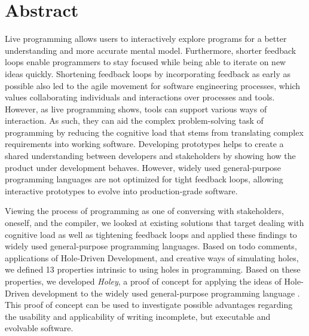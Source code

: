 \chapter{Abstract}
Live programming allows users to interactively explore programs for a better understanding and more accurate mental model.
Furthermore, shorter feedback loops enable programmers to stay focused while being able to iterate on new ideas quickly.
Shortening feedback loops by incorporating feedback as early as possible also led to the agile movement for software engineering processes, which values collaborating individuals and interactions over processes and tools.
However, as live programming shows, tools can support various ways of interaction.
As such, they can aid the complex problem-solving task of programming by reducing the cognitive load that stems from translating complex requirements into working software.
Developing prototypes helps to create a shared understanding between developers and stakeholders by showing how the product under development behaves.
However, widely used general-purpose programming languages are not optimized for tight feedback loops, allowing interactive prototypes to evolve into production-grade software.

Viewing the process of programming as one of conversing with stakeholders, oneself, and the compiler, we looked at existing solutions that target dealing with cognitive load as well as tightening feedback loops and applied these findings to widely used general-purpose programming languages.
Based on todo comments, applications of Hole-Driven Development, and creative ways of simulating holes, we defined 13 properties intrinsic to using holes in programming.
Based on these properties, we developed \emph{Holey}, a proof of concept for applying the ideas of Hole-Driven development to the widely used general-purpose programming language \CS.
This proof of concept can be used to investigate possible advantages regarding the usability and applicability of writing incomplete, but executable and evolvable software.
